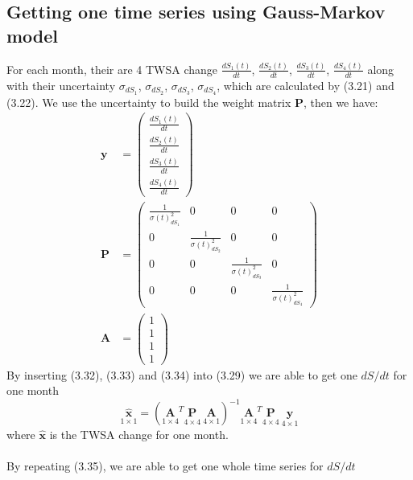\subsection{Getting one time series using Gauss-Markov model}
For each month, their are 4 TWSA change $\frac{dS_1(t)}{dt}$, $\frac{dS_2(t)}{dt}$, $\frac{dS_3(t)}{dt}$, $\frac{dS_4(t)}{dt}$ along with their uncertainty $\sigma_{dS_1}$, $\sigma_{dS_2}$, $\sigma_{dS_3}$, $\sigma_{dS_4}$, which are calculated by (3.21) and (3.22). We use the uncertainty to build the weight matrix $\bm{P}$, then we have:
\begin{align}
\bm{y} &= \begin{pmatrix}
\frac{dS_1(t)}{dt}\\
\frac{dS_2(t)}{dt}\\
\frac{dS_3(t)}{dt}\\
\frac{dS_4(t)}{dt}
\end{pmatrix} \\
\bm{P} &= \begin{pmatrix}
\frac{1}{\sigma(t)_{dS_1}^2} & 0 & 0 & 0 \\
0 & \frac{1}{\sigma(t)_{dS_2}^2} & 0 & 0 \\
0 & 0 & \frac{1}{\sigma(t)_{dS_3}^2} & 0 \\
0 & 0 & 0 & \frac{1}{\sigma(t)_{dS_4}^2}
\end{pmatrix}\\
\bm{A} &= \begin{pmatrix}
1\\
1\\
1\\
1
\end{pmatrix}
\end{align}
By inserting (3.32), (3.33) and (3.34) into (3.29) we are able to get one $dS/dt$ for one month
\begin{equation}
\underset{1 \times 1}{\hat{\bm{x}}} = (\underset{1 \times 4}{\bm{A}}^T \underset{4 \times 4}{\bm{P}} \  \underset{4 \times 1}{\bm{A}})^{-1} \underset{1 \times 4}{\bm{A}}^T \underset{4 \times 4}{\bm{P}} \  \underset{4 \times 1}{\bm{y}}
\end{equation}
where $\hat{\bm{x}}$ is the TWSA change for one month.\\\\
By repeating (3.35), we are able to get one whole time series for $dS / dt$
